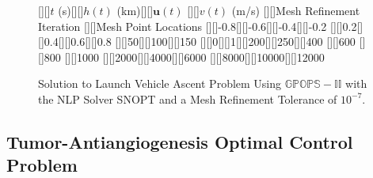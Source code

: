 \documentclass[10pt]{article}
\begin{document}
\begin{figure}[h]
 \psfragscanon
 [][]{\footnotesize$t$ (s)}[][]{\footnotesize$h(t)$ (km)}[][]{\footnotesize$\mathbf{u}(t)$}
 [][]{\footnotesize$v(t)$ (m/s)}
 [][]{\footnotesize Mesh Refinement Iteration}
 [][]{\footnotesize Mesh Point Locations} 
 [][]{\footnotesize -0.8}[][]{\footnotesize -0.6}[][]{\footnotesize -0.4}[][]{\footnotesize -0.2}
 [][]{\footnotesize 0.2}[][]{\footnotesize 0.4}[][]{\footnotesize 0.6}[][]{\footnotesize 0.8}
 [][]{\footnotesize 50}[][]{\footnotesize 100}[][]{\footnotesize 150}
 [][]{\footnotesize 0}[][]{\footnotesize 1}[][]{\footnotesize 200}[][]{\footnotesize 250}[][]{\footnotesize 400}  
 [][]{\footnotesize 600}   [][]{\footnotesize 800}   [][]{\footnotesize 1000}  
 [][]{\footnotesize 2000}[][]{\footnotesize 4000}[][]{\footnotesize 6000}
 [][]{\footnotesize 8000}[][]{\footnotesize 10000}[][]{\footnotesize 12000}
 \centering
 \hspace*{-0.5in}~~~


    \caption{Solution to Launch Vehicle Ascent Problem Using $\mathbb{GPOPS-II}$ with the NLP Solver SNOPT and a Mesh Refinement Tolerance of $10^{-7}$. \label{fig:launchSolution}}

\end{figure}

\clearpage

\subsection{Tumor-Antiangiogenesis Optimal Control Problem}
\end{document}
